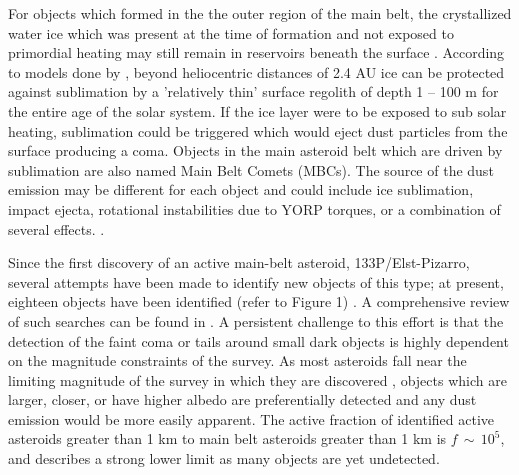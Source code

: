 \documentclass[iop,apj]{emulateapj}
\begin{document}
For objects which formed in the the outer region of the main belt, the crystallized water ice which was present at the time of formation and not exposed to primordial heating may still remain in reservoirs beneath the surface \citep{prailnik09}.  According to models done by \citet*{fanale89},  beyond heliocentric distances of 2.4 AU ice can be protected against sublimation by a 'relatively thin' surface regolith  of depth 1 -- 100 m for the entire age of the solar system. If the ice layer were to be exposed to sub solar heating,  sublimation could be triggered which would  eject dust particles from the surface producing a coma. Objects in the main asteroid belt which are driven by sublimation are also named Main Belt Comets (MBCs). The source of the dust emission may be different for each object and could include ice sublimation, impact ejecta, rotational instabilities due to YORP torques, or a combination of several effects. \citep{hsieh15}.  


Since the first discovery of an active main-belt asteroid, 133P/Elst-Pizarro, several attempts have been made to identify new objects of this type; at present, eighteen objects have been identified (refer to Figure 1)  \citep{jewitt15}. A comprehensive review of such searches can be found in \citet{hsieh15}.  A persistent challenge to this effort is that the detection of the faint coma or tails around small dark objects is highly dependent on the magnitude constraints of the survey. As most asteroids fall near the limiting magnitude of the survey in which they are discovered \citep{jewitt15}%
, objects which are larger, closer, or have higher albedo are preferentially detected and any dust emission would be more easily apparent. The active fraction of identified active asteroids greater than 1 km to main belt asteroids greater than 1 km is $f \, \sim \, 10^5$, and describes a strong lower limit as many objects are yet undetected. \citep{jewitt15} %
\end{document}
